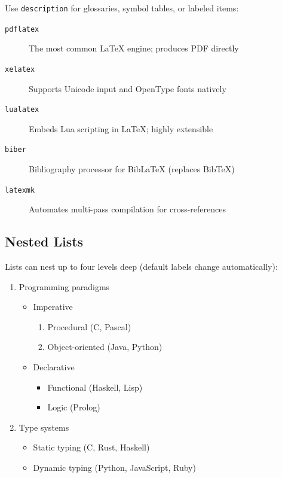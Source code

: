 \documentclass[12pt,a4paper]{article}
\begin{document}
Use \texttt{description} for glossaries, symbol tables, or labeled items:

\begin{description}
    \item[\texttt{pdflatex}] The most common \LaTeX{} engine; produces PDF directly
    \item[\texttt{xelatex}] Supports Unicode input and OpenType fonts natively
    \item[\texttt{lualatex}] Embeds Lua scripting in \LaTeX; highly extensible
    \item[\texttt{biber}]    Bibliography processor for BibLaTeX (replaces BibTeX)
    \item[\texttt{latexmk}]  Automates multi-pass compilation for cross-references
\end{description}

\subsection{Nested Lists}

Lists can nest up to four levels deep (default labels change automatically):

\begin{enumerate}
    \item Programming paradigms
        \begin{itemize}
            \item Imperative
                \begin{enumerate}
                    \item Procedural (C, Pascal)
                    \item Object-oriented (Java, Python)
                \end{enumerate}
            \item Declarative
                \begin{itemize}
                    \item Functional (Haskell, Lisp)
                    \item Logic (Prolog)
                \end{itemize}
        \end{itemize}
    \item Type systems
        \begin{itemize}
            \item Static typing (C, Rust, Haskell)
            \item Dynamic typing (Python, JavaScript, Ruby)
        \end{itemize}
\end{enumerate}
\end{document}
